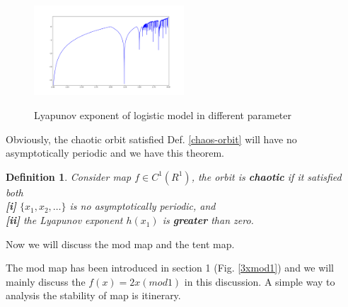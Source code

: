 \documentclass[12pt]{article}
\theoremstyle{plain}
\newtheorem{definition}{\textbf{Definition}}[section]
\begin{document}
\begin{figure}[H]
\begin{center}
\includegraphics[width=0.5\textwidth]{figure/section3/logistic-lyapunov-exp.png} \\
\caption{Lyapunov exponent of logistic model in different parameter}\label{logistic-lyapunov-exp}
\end{center}
\end{figure}


Obviously, the chaotic orbit satisfied Def. \ref{chaos-orbit} will have no asymptotically periodic and we have this theorem.


\begin{definition}\label{Lyapunov-exponent-chaotic} Consider map $f \in C^1(R^1)$, the orbit is \textbf{chaotic} if it satisfied both
\\\noindent \textbf{[i]} $\{x_1, x_2, \ldots \}$ is no asymptotically periodic, and
\\\noindent \textbf{[ii]} the Lyapunov exponent $h(x_1)$ is \textbf{greater} than zero.
\end{definition}









Now we will discuss the mod map and the tent map.

The mod map has been introduced in section 1 (Fig. \ref{3xmod1}) and we will mainly discuss the $f(x) = 2x (mod 1)$ in this discussion. A simple way to analysis the stability of map is itinerary.\\[3ex]
\end{document}
